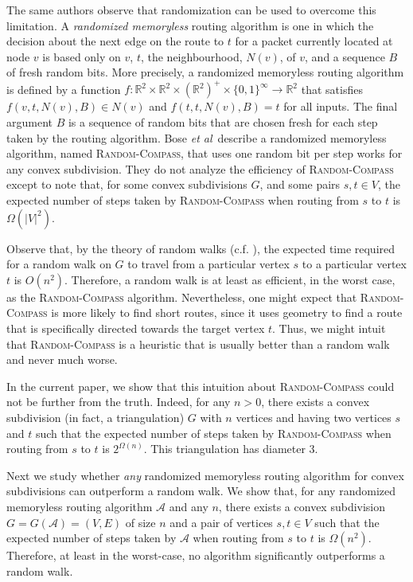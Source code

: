 \documentclass [letterpaper] {patmorin}
\newcommand{\R}{\mathbb{R}}
\newcommand{\etal}{\emph{et al}}
\begin{document}
The same authors \cite{bose02,bose04} observe that randomization can be used to overcome this limitation.  A \emph{randomized memoryless} routing algorithm is one in which the decision about the next edge on the route to $t$ for a packet currently located at node $v$ is based only on $v$, $t$, the neighbourhood, $N(v)$, of $v$, and a sequence $B$ of fresh random bits.  More precisely, a randomized memoryless routing algorithm is defined by a function $f:\R^2\times\R^2\times(\R^2)^+\times\{0,1\}^\infty\rightarrow \R^2$ that satisfies $f(v,t,N(v),B) \in N(v)$ and $f(t,t,N(v),B) = t$ for all inputs.  The final argument $B$ is a sequence of random bits that are chosen fresh for each step taken by the routing algorithm. Bose \etal\ describe a randomized memoryless algorithm, named \textsc{Random-Compass}, that uses one random bit per step works for any convex subdivision. They do not analyze the efficiency of \textsc{Random-Compass} except to note that, for some convex subdivisions $G$, and some pairs $s,t\in V$, the expected number of steps taken by \textsc{Random-Compass} when routing from $s$ to $t$ is $\Omega(|V|^2)$.  

Observe that, by the theory of random walks (c.f. \cite[Theorem~6.6]{mr95}), the expected time required for a random walk on $G$ to travel from a particular vertex $s$ to a particular vertex $t$ is $O(n^2)$.  Therefore, a random walk is at least as efficient, in the worst case, as the \textsc{Random-Compass} algorithm. Nevertheless, one might expect that \textsc{Random-Compass} is more likely to find short routes, since it uses geometry to find a route that is specifically directed towards the target vertex $t$.  Thus, we might intuit that \textsc{Random-Compass} is a heuristic that is usually better than a random walk and never much worse.

In the current paper, we show that this intuition about \textsc{Random-Compass} could not be further from the truth.  Indeed, for any $n>0$, there exists a convex subdivision (in fact, a triangulation) $G$ with $n$ vertices and having two vertices $s$ and $t$ such that the expected number of steps taken by \textsc{Random-Compass} when routing from $s$ to $t$ is $2^{\Omega(n)}$. This triangulation has diameter 3.

Next we study whether \emph{any} randomized memoryless routing algorithm for convex subdivisions can outperform a random walk.  We show that, for any randomized memoryless routing algorithm $\mathcal{A}$ and any $n$, there exists a convex subdivision $G=G(\mathcal{A})=(V,E)$ of size $n$ and a pair of vertices $s,t\in V$ such that the expected number of steps taken by $\mathcal{A}$ when routing from $s$ to $t$ is $\Omega(n^2)$.  Therefore, at least in the worst-case, no algorithm significantly outperforms a random walk.
\end{document}
